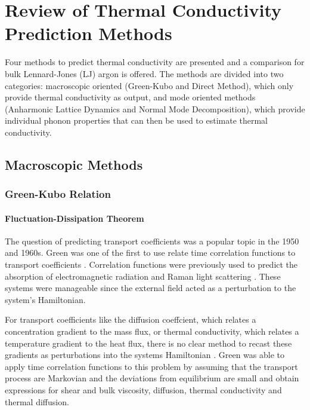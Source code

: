 \chapter{Review of Thermal Conductivity Prediction Methods}\label{CHP:background}
Four methods to predict thermal conductivity are presented and a comparison for bulk Lennard-Jones (LJ) argon is offered. The methods are divided into two categories: macroscopic oriented (Green-Kubo and Direct Method), which only provide thermal conductivity as output, and mode oriented methods (Anharmonic Lattice Dynamics and Normal Mode Decomposition), which provide individual phonon properties that can then be used to estimate thermal conductivity.

\section{Macroscopic Methods}
\subsection{Green-Kubo Relation}
\subsubsection{Fluctuation-Dissipation Theorem}

The question of predicting transport coefficients was a popular topic in the 1950 and 1960s. Green was one of the first to use relate time correlation functions to transport coefficients \cite{green1954markoff}. Correlation functions were previously used to predict the absorption of electromagnetic radiation \cite{gordon1968correlation} and Raman light scattering \cite{gordon1965molecular}. These systems were manageable since the external field acted as a perturbation to the system's Hamiltonian.

For transport coefficients like the diffusion coeffcient, which relates a concentration gradient to the mass flux, or thermal conductivity, which relates a temperature gradient to the heat flux, there is no clear method to recast these gradients as perturbations into the systems Hamiltonian \cite {mcquarrie2000statistical}. Green was able to apply time correlation functions to this problem by assuming that the transport process are Markovian and the deviations from equilibrium are small \cite{green1954markoff} and obtain expressions for shear and bulk viscosity, diffusion, thermal conductivity and thermal diffusion.

